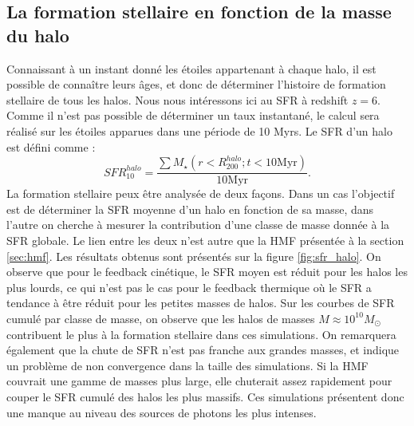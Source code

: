 \subsection{La formation stellaire en fonction de la masse du halo}
\label{sec:sfr_halo}
Connaissant à un instant donné les étoiles appartenant à chaque halo, il est possible de connaître leurs âges, et donc de déterminer l'histoire de formation stellaire de tous les halos.
Nous nous intéressons ici au \ac{SFR} à redshift $z=6$.
Comme il n'est pas possible de déterminer un taux instantané, le calcul sera réalisé sur les étoiles apparues dans une période de 10 Myrs.
Le \ac{SFR} d'un halo est défini comme :
\begin{equation}
	SFR_{10}^{halo} = \frac{ \sum M_{\star} \left( r<R_{200}^{halo}; t<10\mathrm{Myr}\right) }{10\mathrm{Myr}}.
\end{equation}
La formation stellaire peux être analysée de deux façons.
Dans un cas l'objectif est de déterminer la \ac{SFR} moyenne d'un halo en fonction de sa masse, dans l'autre on cherche à mesurer la contribution d'une classe de masse donnée à la \ac{SFR} globale.
Le lien entre les deux n'est autre que la \ac{HMF} présentée à la section \ref{sec:hmf}.
Les résultats obtenus sont présentés sur la figure \ref{fig:sfr_halo}.
On observe que pour le feedback cinétique, le \ac{SFR} moyen est réduit pour les halos les plus lourds, ce qui n'est pas le cas pour le feedback thermique où le \ac{SFR} a tendance à être réduit pour les petites masses de halos.
Sur les courbes de \ac{SFR} cumulé par classe de masse, on observe que les halos de masses $M\approx10^{10}M_\odot$ contribuent le plus à la formation stellaire dans ces simulations.
On remarquera également que la chute de \ac{SFR} n'est pas franche aux grandes masses, et indique un problème de non convergence dans la taille des simulations.
Si la \ac{HMF} couvrait une gamme de masses plus large, elle chuterait assez rapidement pour couper le \ac{SFR} cumulé des halos les plus massifs.
Ces simulations présentent donc une manque au niveau des sources de photons les plus intenses.

